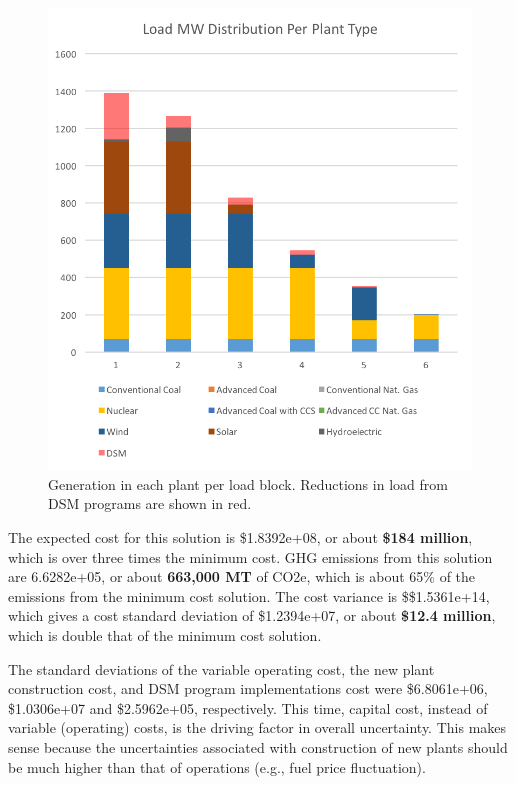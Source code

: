 \documentclass{article}
\begin{document}
		\begin{figure}
			\includegraphics[scale=0.7]{429_5_Minemloaddist}
			\centering
			\caption{Generation in each plant per load block. Reductions in load from DSM programs are shown in red.}
		\end{figure}
		
		The expected cost for this solution is \$1.8392e+08, or about \textbf{\$184 million}, which is over three times the minimum cost. GHG emissions from this solution are 6.6282e+05, or about \textbf{663,000 MT} of CO2e, which is about 65\% of the emissions from the minimum cost solution. The cost variance is \$\$1.5361e+14, which gives a cost standard deviation of \$1.2394e+07, or about \textbf{\$12.4 million}, which is double that of the minimum cost solution. 
		
		The standard deviations of the variable operating cost, the new plant construction cost, and DSM program implementations cost were \$6.8061e+06, \$1.0306e+07 and \$2.5962e+05, respectively. This time, capital cost, instead of variable (operating) costs, is the driving factor in overall uncertainty. This makes sense because the uncertainties associated with construction of new plants should be much higher than that of operations (e.g., fuel price fluctuation). 
		
\end{document}
